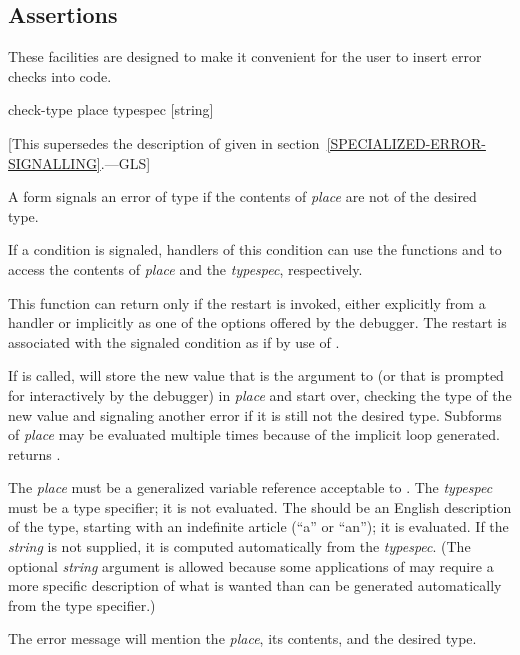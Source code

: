 \subsection{Assertions}
\label{CONDITION-ASSERTIONS}


These facilities are designed to make it convenient for the user
to insert error checks into code.

\begin{defmac}
check-type place typespec [string]

   [This supersedes the description of 
   given in section~\ref{SPECIALIZED-ERROR-SIGNALLING}.---GLS]

  A  form signals an error of type
   if the contents of {\it place} are not of the
  desired type.

  If a condition is signaled, handlers of this condition can use the
  functions  and  to access the
  contents of {\it place} and the {\it typespec}, respectively.

  This function can return only if the  restart is invoked, either
  explicitly from a handler or implicitly as one of the options offered by the
  debugger.
The restart is associated with the signaled condition as if by
use of .

  If  is called,  will store the new value that is
  the argument to  (or that is prompted for interactively by
  the debugger) in {\it place} and start over, checking the type of the new value
  and signaling another error if it is still not the desired type. Subforms
  of {\it place} may be evaluated multiple times because of the implicit loop
  generated.  returns .

  The {\it place} must be a generalized variable reference acceptable to . The
  {\it typespec} must be a type specifier; it is not evaluated.  The  should
  be an English description of the type, starting with an indefinite article
  (``a'' or ``an''); it is evaluated. If the {\it string} is not supplied, it is computed
  automatically from the {\it typespec}. (The optional {\it string} argument is allowed 
  because some applications of  may require a more specific
  description of what is wanted than can be generated automatically from the
  type specifier.)

  The error message will mention the {\it place}, its contents, and the desired type.


\end{defmac}
